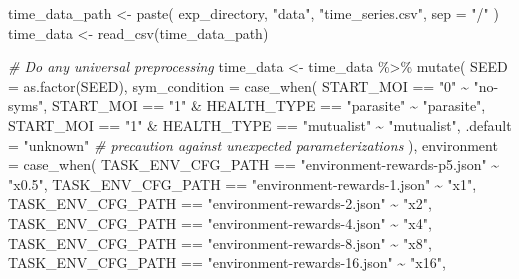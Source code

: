 \documentclass[
]{book}
\newenvironment{Shaded}{\begin{snugshade}}{\end{snugshade}}
\newcommand{\AttributeTok}[1]{\textcolor[rgb]{0.77,0.63,0.00}{#1}}
\newcommand{\CommentTok}[1]{\textcolor[rgb]{0.56,0.35,0.01}{\textit{#1}}}
\newcommand{\FunctionTok}[1]{\textcolor[rgb]{0.00,0.00,0.00}{#1}}
\newcommand{\NormalTok}[1]{#1}
\newcommand{\OtherTok}[1]{\textcolor[rgb]{0.56,0.35,0.01}{#1}}
\newcommand{\SpecialCharTok}[1]{\textcolor[rgb]{0.00,0.00,0.00}{#1}}
\newcommand{\StringTok}[1]{\textcolor[rgb]{0.31,0.60,0.02}{#1}}
\begin{document}
\begin{Shaded}
\begin{Highlighting}[]
\NormalTok{time\_data\_path }\OtherTok{\textless{}{-}} \FunctionTok{paste}\NormalTok{(}
\NormalTok{  exp\_directory,}
  \StringTok{"data"}\NormalTok{,}
  \StringTok{"time\_series.csv"}\NormalTok{,}
  \AttributeTok{sep =} \StringTok{"/"}
\NormalTok{)}
\NormalTok{time\_data }\OtherTok{\textless{}{-}} \FunctionTok{read\_csv}\NormalTok{(time\_data\_path)}

\CommentTok{\# Do any universal preprocessing}
\NormalTok{time\_data }\OtherTok{\textless{}{-}}\NormalTok{ time\_data }\SpecialCharTok{\%\textgreater{}\%}
  \FunctionTok{mutate}\NormalTok{(}
    \AttributeTok{SEED =} \FunctionTok{as.factor}\NormalTok{(SEED),}
    \AttributeTok{sym\_condition =} \FunctionTok{case\_when}\NormalTok{(}
\NormalTok{      START\_MOI }\SpecialCharTok{==} \StringTok{"0"} \SpecialCharTok{\textasciitilde{}} \StringTok{"no{-}syms"}\NormalTok{,}
\NormalTok{      START\_MOI }\SpecialCharTok{==} \StringTok{"1"} \SpecialCharTok{\&}\NormalTok{ HEALTH\_TYPE }\SpecialCharTok{==} \StringTok{"parasite"} \SpecialCharTok{\textasciitilde{}} \StringTok{"parasite"}\NormalTok{,}
\NormalTok{      START\_MOI }\SpecialCharTok{==} \StringTok{"1"} \SpecialCharTok{\&}\NormalTok{ HEALTH\_TYPE }\SpecialCharTok{==} \StringTok{"mutualist"} \SpecialCharTok{\textasciitilde{}} \StringTok{"mutualist"}\NormalTok{,}
      \AttributeTok{.default =} \StringTok{"unknown"} \CommentTok{\# precaution against unexpected parameterizations}
\NormalTok{    ),}
    \AttributeTok{environment =} \FunctionTok{case\_when}\NormalTok{(}
\NormalTok{      TASK\_ENV\_CFG\_PATH }\SpecialCharTok{==} \StringTok{"environment{-}rewards{-}p5.json"} \SpecialCharTok{\textasciitilde{}} \StringTok{"x0.5"}\NormalTok{,}
\NormalTok{      TASK\_ENV\_CFG\_PATH }\SpecialCharTok{==} \StringTok{"environment{-}rewards{-}1.json"} \SpecialCharTok{\textasciitilde{}} \StringTok{"x1"}\NormalTok{,}
\NormalTok{      TASK\_ENV\_CFG\_PATH }\SpecialCharTok{==} \StringTok{"environment{-}rewards{-}2.json"} \SpecialCharTok{\textasciitilde{}} \StringTok{"x2"}\NormalTok{,}
\NormalTok{      TASK\_ENV\_CFG\_PATH }\SpecialCharTok{==} \StringTok{"environment{-}rewards{-}4.json"} \SpecialCharTok{\textasciitilde{}} \StringTok{"x4"}\NormalTok{,}
\NormalTok{      TASK\_ENV\_CFG\_PATH }\SpecialCharTok{==} \StringTok{"environment{-}rewards{-}8.json"} \SpecialCharTok{\textasciitilde{}} \StringTok{"x8"}\NormalTok{,}
\NormalTok{      TASK\_ENV\_CFG\_PATH }\SpecialCharTok{==} \StringTok{"environment{-}rewards{-}16.json"} \SpecialCharTok{\textasciitilde{}} \StringTok{"x16"}\NormalTok{,}

\end{Highlighting}
\end{Shaded}
\end{document}
